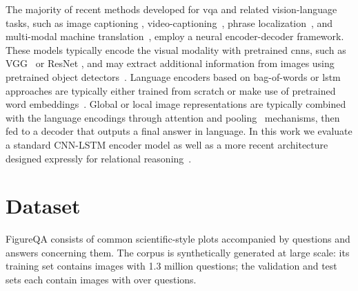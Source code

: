\documentclass{article} \usepackage{iclr2018_workshop,times}
\begin{document}
The majority of recent methods developed for \gls{vqa} and related vision-language tasks, such as image captioning 
\citep{xu2015show, fang2015captions}, video-captioning~\citep{yu2016video}, phrase localization~\citep{hu2016natural}, 
and multi-modal machine translation~\citep{elliott2017imagination}, employ a neural
encoder-decoder framework. These models typically encode the visual modality with 
pretrained \glspl{cnn}, such as VGG~\citep{simonyan2014very} or ResNet
\citep{he2016deep}, and may extract additional information from images 
using pretrained object detectors~\citep{ren15fasterrcnn}. Language encoders
based on bag-of-words or \gls{lstm} approaches are typically either trained from scratch
\citep{elliott2017imagination} or make use of pretrained word embeddings~\citep{you2016image}.
Global or local image representations are typically combined with the language encodings through attention
\citep{xiong2016dynamic, yang2016stacked, lu2016hierarchical} and pooling~\citep{fukui2016multimodal} mechanisms,
then fed to a decoder that outputs a final answer in language.
In this work we evaluate a standard CNN-LSTM encoder model as well as a more recent architecture designed expressly for relational reasoning~\citep{santoro2017simple}.

\section{Dataset}
\label{sec:dataset}
FigureQA consists of common scientific-style plots accompanied by questions and answers concerning them. The corpus is synthetically generated at large scale: its training set contains  images with 1.3 million questions; the validation and test sets each contain  images with over  questions.
\end{document}
